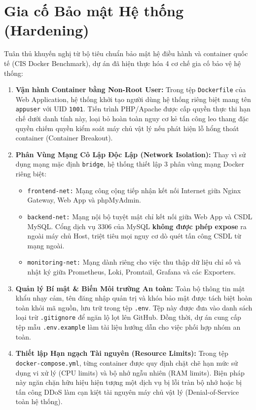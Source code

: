 \documentclass[12pt,a4paper,oneside]{report}
\begin{document}
\chapter{Gia cố Bảo mật Hệ thống (Hardening)}

Tuân thủ khuyến nghị từ bộ tiêu chuẩn bảo mật hệ điều hành và container quốc tế (CIS Docker Benchmark), dự án đã hiện thực hóa 4 cơ chế gia cố bảo vệ hệ thống:

\begin{enumerate}
    \item \textbf{Vận hành Container bằng Non-Root User:}
    Trong tệp \texttt{Dockerfile} của Web Application, hệ thống khởi tạo người dùng hệ thống riêng biệt mang tên \texttt{appuser} với UID \texttt{1001}. Tiến trình PHP/Apache được cấp quyền thực thi hạn chế dưới danh tính này, loại bỏ hoàn toàn nguy cơ kẻ tấn công leo thang đặc quyền chiếm quyền kiểm soát máy chủ vật lý nếu phát hiện lỗ hổng thoát container (Container Breakout).

    \item \textbf{Phân Vùng Mạng Cô Lập Độc Lập (Network Isolation):}
    Thay vì sử dụng mạng mặc định \texttt{bridge}, hệ thống thiết lập 3 phân vùng mạng Docker riêng biệt:
    \begin{itemize}
        \item \texttt{frontend-net:} Mạng công cộng tiếp nhận kết nối Internet giữa Nginx Gateway, Web App và phpMyAdmin.
        \item \texttt{backend-net:} Mạng nội bộ tuyệt mật chỉ kết nối giữa Web App và CSDL MySQL. Cổng dịch vụ 3306 của MySQL \textbf{không được phép expose} ra ngoài máy chủ Host, triệt tiêu mọi nguy cơ dò quét tấn công CSDL từ mạng ngoài.
        \item \texttt{monitoring-net:} Mạng dành riêng cho việc thu thập dữ liệu chỉ số và nhật ký giữa Prometheus, Loki, Promtail, Grafana và các Exporters.
    \end{itemize}

    \item \textbf{Quản lý Bí mật \& Biến Môi trường An toàn:}
    Toàn bộ thông tin mật khẩu nhạy cảm, tên đăng nhập quản trị và khóa bảo mật được tách biệt hoàn toàn khỏi mã nguồn, lưu trữ trong tệp \texttt{.env}. Tệp này được đưa vào danh sách loại trừ \texttt{.gitignore} để ngăn lộ lọt lên GitHub. Đồng thời, dự án cung cấp tệp mẫu \texttt{.env.example} làm tài liệu hướng dẫn cho việc phối hợp nhóm an toàn.

    \item \textbf{Thiết lập Hạn ngạch Tài nguyên (Resource Limits):}
    Trong tệp \texttt{docker-compose.yml}, từng container được quy định chặt chẽ hạn mức sử dụng vi xử lý (CPU limits) và bộ nhớ ngẫu nhiên (RAM limits). Biện pháp này ngăn chặn hữu hiệu hiện tượng một dịch vụ bị lỗi tràn bộ nhớ hoặc bị tấn công DDoS làm cạn kiệt tài nguyên máy chủ vật lý (Denial-of-Service toàn hệ thống).
\end{enumerate}
\end{document}
